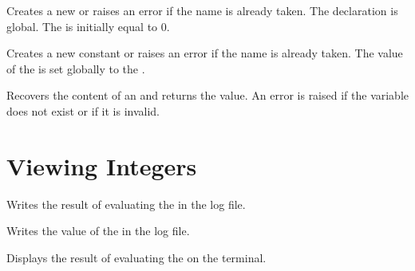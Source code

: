 \documentclass[oneside]{book}
\begin{document}
\begin{function}{\IntNew}
\begin{syntax}
 
\end{syntax}
Creates a new  or raises an error if the name is
already taken. The declaration is global. The  is
initially equal to $0$.
\end{function}

\begin{function}{\IntConst}
\begin{syntax}
  
\end{syntax}
Creates a new constant  or raises an error if the name
is already taken. The value of the  is set
globally to the .
\end{function}

\begin{function}{\IntUse}
\begin{syntax}
 
\end{syntax}
Recovers the content of an  and returns the value.
An error is raised if the variable does not exist or if it is invalid.
\end{function}

\section{Viewing Integers}

\begin{function}{\IntLog}
\begin{syntax}
 
\end{syntax}
Writes the result of evaluating the 
in the log file.
\end{function}

\begin{function}{\IntVarLog}
\begin{syntax}
 
\end{syntax}
Writes the value of the  in the log file.
\end{function}

\begin{function}{\IntShow}
\begin{syntax}
 
\end{syntax}
Displays the result of evaluating the 
on the terminal.
\end{function}
\end{document}
